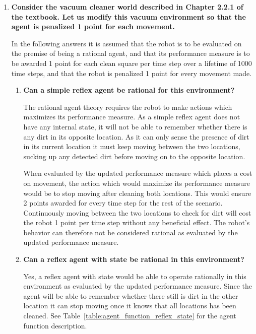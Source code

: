 \begin{enumerate}
\begin{enumerate}
\end{enumerate}

\item \textbf{Consider the vacuum cleaner world described in Chapter 2.2.1 of the textbook. Let us modify this vacuum environment so that the agent is penalized 1 point for each movement.}

In the following answers it is assumed that the robot is to be evaluated on the premise of being a rational agent, and that its performance measure is to be awarded 1 point for each clean square per time step over a lifetime of 1000 time steps, and that the robot is penalized 1 point for every movement made.

\begin{enumerate}

\item \textbf{Can a simple reflex agent be rational for this environment?} 

The rational agent theory requires the robot to make actions which maximizes its performance measure. As a simple reflex agent does not have any internal state, it will not be able to remember whether there is any dirt in its opposite location. As it can only sense the presence of dirt in its current location it must keep moving between the two locations, sucking up any detected dirt before moving on to the opposite location. 

When evaluated by the updated performance measure which places a cost on movement, the action which would maximize its performance measure would be to stop moving after cleaning both locations. This would ensure 2 points awarded for every time step for the rest of the scenario. Continuously moving between the two locations to check for dirt will cost the robot 1 point per time step without any beneficial effect. The robot's behavior can therefore not be considered rational as evaluated by the updated performance measure. 

\item \textbf{Can a reflex agent with state be rational in this environment?}

Yes, a reflex agent with state would be able to operate rationally in this environment as evaluated by the updated performance measure. Since the agent will be able to remember whether there still is dirt in the other location it can stop moving once it knows that all locations has been cleaned. See Table~\ref{table:agent_function_reflex_state} for the agent function description.


\end{enumerate}
\end{enumerate}
